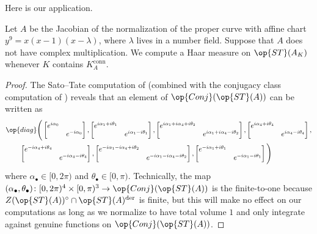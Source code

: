 \documentclass[../thesis.tex]{subfiles}
\begin{document}
Here is our application.
\begin{proposition} \label{prop:generic-fermat-st-measure}
	Let $A$ be the Jacobian of the normalization of the proper curve with affine chart $y^9=x(x-1)(x-\lambda)$, where $\lambda$ lives in a number field. Suppose that $A$ does not have complex multiplication. We compute a Haar measure on $\op{ST}(A_K)$ whenever $K$ contains $K_A^{\mathrm{conn}}$.
\end{proposition}
\begin{proof}
	The Sato--Tate computation of  (combined with the conjugacy class computation of ) reveals that an element of $\op{Conj}(\op{ST}(A))$ can be written as
	\begin{align*}
		&\op{diag}\Bigg(\begin{bmatrix}
			e^{i\alpha_0} \\ & e^{-i\alpha_0}
		\end{bmatrix},\begin{bmatrix}
			e^{i\alpha_1+i\theta_1} \\ & e^{i\alpha_1-i\theta_1}
		\end{bmatrix},\begin{bmatrix}
			e^{i\alpha_1+i\alpha_4+i\theta_2} \\ & e^{i\alpha_1+i\alpha_4-i\theta_2}
		\end{bmatrix},\begin{bmatrix}
			e^{i\alpha_4+i\theta_4} \\ & e^{i\alpha_4-i\theta_4}
		\end{bmatrix}, \\
		&\qquad\begin{bmatrix}
			e^{-i\alpha_4+i\theta_4} \\ & e^{-i\alpha_4-i\theta_4}
		\end{bmatrix},\begin{bmatrix}
			e^{-i\alpha_1-i\alpha_4+i\theta_2} \\ & e^{-i\alpha_1-i\alpha_4-i\theta_2}
		\end{bmatrix},\begin{bmatrix}
			e^{-i\alpha_1+i\theta_1} \\ & e^{-i\alpha_1-i\theta_1}
		\end{bmatrix}\Bigg)
	\end{align*}
	where $\alpha_\bullet\in[0,2\pi)$ and $\theta_\bullet\in[0,\pi)$. Technically, the map $(\alpha_\bullet,\theta_\bullet)\colon[0,2\pi)^4\times[0,\pi)^3\to\op{Conj}(\op{ST}(A))$ is the finite-to-one because $Z(\op{ST}(A))^\circ\cap\op{ST}(A)^{\mathrm{der}}$ is finite, but this will make no effect on our computations as long as we normalize to have total volume $1$ and only integrate against genuine functions on $\op{Conj}(\op{ST}(A))$.
	

\end{proof}
\end{document}
